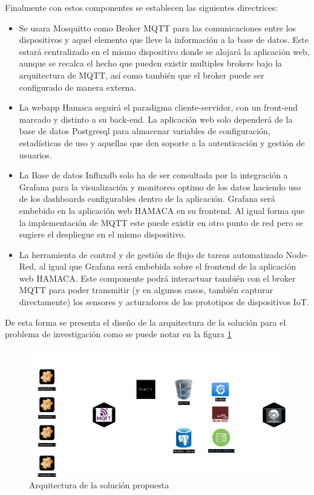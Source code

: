 Finalmente con estos componentes se establecen las siguientes directrices:
\begin{itemize}

\item Se usara Mosquitto como Broker MQTT para las comunicaciones entre los dispositivos y aquel elemento que lleve la información a la base de datos. Este estará centralizado en el mismo dispositivo donde se alojará la aplicación web, aunque se recalca el hecho que pueden existir multiples brokers bajo la arquitectura de MQTT, así como también que el broker puede ser configurado de manera externa.


\item La webapp Hamaca seguirá el paradigma cliente-servidor, con un front-end marcado y distinto a su back-end. La aplicación web solo dependerá de la base de datos Postgresql para almacenar variables de configuración, estadísticas de uso y aquellas que den soporte a la autenticación y gestión de usuarios.


\item La Base de datos Influxdb solo ha de ser consultada por la integración a Grafana para la visualización y monitoreo optimo de los datos haciendo uso de los dashboards configurables dentro de la aplicación. Grafana será embebido en la aplicación web HAMACA en su frontend. Al igual forma que la implementación de MQTT este puede existir en otro punto de red pero se sugiere el despliegue en el mismo dispositivo. 

\item La herramienta de control y de gestión de flujo de tareas automatizado Node-Red, al igual que Grafana será embebida sobre el frontend de la aplicación web HAMACA. Este componente podrá interactuar también con el broker MQTT para poder transmitir (y en algunos casos, también capturar directamente) los sensores y acturadores de los prototipos de dispositivos IoT.

\end{itemize}
De esta forma se presenta el diseño de la arquitectura de la solución para el problema de investigación como se puede notar en la figura \ref{fig:arquitectura_hamaca}
\begin{figure}[!htb]
\centering
\includegraphics[scale=0.4]{./Figuras/arquitectura_hamaca.png}
\caption{Arquitectura de la solución propuesta}
\label{fig:arquitectura_hamaca}
\vspace*{-10pt}
\end{figure}

